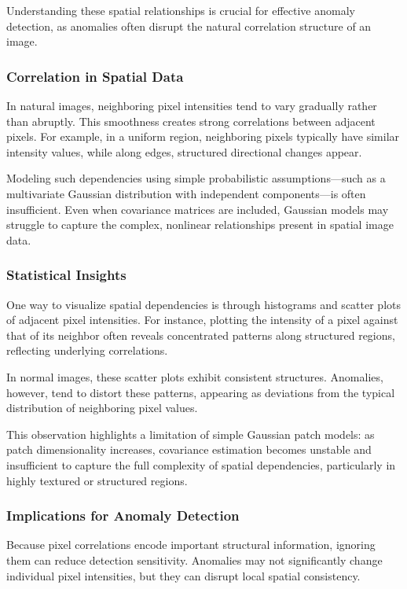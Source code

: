 \documentclass{article}
\begin{document}
Understanding these spatial relationships is crucial for effective anomaly
detection, as anomalies often disrupt the natural correlation structure of an
image.

\subsubsection{Correlation in Spatial Data}

In natural images, neighboring pixel intensities tend to vary gradually rather
than abruptly. This smoothness creates strong correlations between adjacent
pixels. For example, in a uniform region, neighboring pixels typically have
similar intensity values, while along edges, structured directional changes
appear.

Modeling such dependencies using simple probabilistic assumptions—such as a
multivariate Gaussian distribution with independent components—is often
insufficient. Even when covariance matrices are included, Gaussian models may
struggle to capture the complex, nonlinear relationships present in spatial
image data.

\subsubsection{Statistical Insights}

One way to visualize spatial dependencies is through histograms and scatter
plots of adjacent pixel intensities. For instance, plotting the intensity of a
pixel against that of its neighbor often reveals concentrated patterns along
structured regions, reflecting underlying correlations.

In normal images, these scatter plots exhibit consistent structures. Anomalies,
however, tend to distort these patterns, appearing as deviations from the
typical distribution of neighboring pixel values.

This observation highlights a limitation of simple Gaussian patch models:
as patch dimensionality increases, covariance estimation becomes unstable and
insufficient to capture the full complexity of spatial dependencies,
particularly in highly textured or structured regions.

\subsubsection{Implications for Anomaly Detection}

Because pixel correlations encode important structural information, ignoring
them can reduce detection sensitivity. Anomalies may not significantly change
individual pixel intensities, but they can disrupt local spatial consistency.
\end{document}
